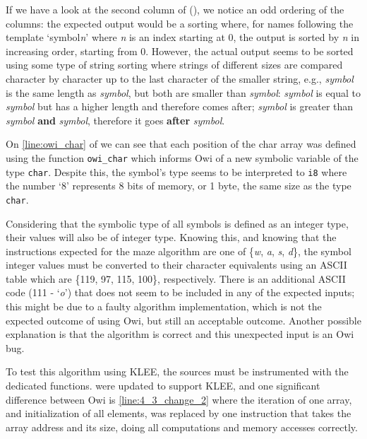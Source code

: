 If we have a look at the second column of  (), we notice an odd ordering of the columns: the expected output would be a sorting where, for names following the template `symbol\myunderscore\textit{n}' where \textit{n} is an index starting at 0, the output is sorted by \textit{n} in increasing order, starting from 0. However, the actual output seems to be sorted using some type of string sorting where strings of different sizes are compared character by character up to the last character of the smaller string, e.g., \textit{symbol} is the same length as \textit{symbol}, but both are smaller than \textit{symbol}: \textit{symbol} is equal to \textit{symbol} but has a higher length and therefore comes after; \textit{symbol} is greater than \textit{symbol} \textbf{and} \textit{symbol}, therefore it goes \textbf{after} \textit{symbol}.

On \cref{line:owi_char} of  we can see that each position of the char array was defined using the function \lstinline$owi_char$ which informs Owi of a new symbolic variable of the type \lstinline$char$. Despite this, the symbol's type seems to be interpreted to \lstinline$i8$ where the number `8' represents 8 bits of memory, or 1 byte, the same size as the type \lstinline$char$.

Considering that the symbolic type of all symbols is defined as an integer type, their values will also be of integer type. Knowing this, and knowing that the instructions expected for the maze algorithm are one of \{\textit{w}, \textit{a}, \textit{s}, \textit{d}\}, the symbol integer values must be converted to their character equivalents using an ASCII table which are \{119, 97, 115, 100\}, respectively. There is an additional ASCII code (111 - `\textit{o}') that does not seem to be included in any of the expected inputs; this might be due to a faulty algorithm implementation, which is not the expected outcome of using Owi, but still an acceptable outcome. Another possible explanation is that the algorithm is correct and this unexpected input is an Owi bug.

To test this algorithm using KLEE, the sources must be instrumented with the dedicated functions.  were updated to support KLEE, and one significant difference between Owi is \cref{line:4_3_change_2} where the iteration of one array, and initialization of all elements, was replaced by one instruction that takes the array address and its size, doing all computations and memory accesses correctly.

